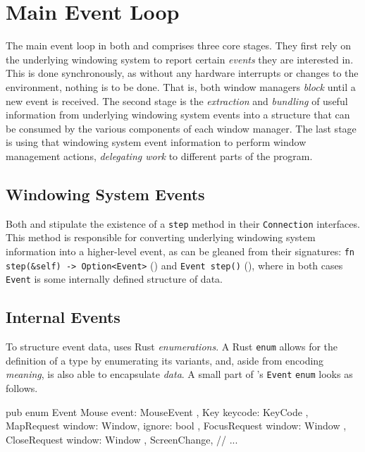 \section{Main Event Loop}

The main event loop  in both \wmrs and \wmcpp comprises  three core stages. They
first rely on the underlying  windowing system to report certain \textit{events}
they are  interested in.  This is  done synchronously,  as without  any hardware
interrupts or changes to  the environment, nothing is to be  done. That is, both
window managers \textit{block}  until a new event is received.  The second stage
is  the \textit{extraction}  and  \textit{bundling} of  useful information  from
underlying windowing system events into a  structure that can be consumed by the
various  components  of each  window  manager.  The  last  stage is  using  that
windowing  system  event  information  to  perform  window  management  actions,
\textit{delegating work} to different parts of the program.

\subsection{Windowing System Events}

Both  \wmrs  and  \wmcpp  stipulate  the existence  of  a  \texttt{step}  method
in  their  \texttt{Connection}  interfaces.   This  method  is  responsible  for
converting underlying windowing system information into a higher-level event, as
can  be  gleaned  from  their signatures:  \texttt{fn  step(&self)  ->
Option<Event>}  (\wmrs) and  \texttt{Event step()}  (\wmcpp), where  in
both cases \texttt{Event} is some internally defined structure of data.

\subsection{Internal Events}


To  structure  event  data,  \wmrs   uses  Rust  \textit{enumerations}.  A  Rust
\texttt{enum}  allows for  the  definition of  a  type by  enumerating
its  variants,  and,   aside  from  encoding  \textit{meaning},   is  also  able
to  encapsulate   \textit{data}\cite{therustbook}.  A  small  part   of  \wmrs's
\texttt{Event} \texttt{enum} looks as follows.

\begin{rustblock}
  pub enum Event {
    Mouse { event: MouseEvent },
    Key { keycode: KeyCode },
    MapRequest { window: Window, ignore: bool },
    FocusRequest { window: Window },
    CloseRequest { window: Window },
    ScreenChange,
    // ...
  }
\end{rustblock}

